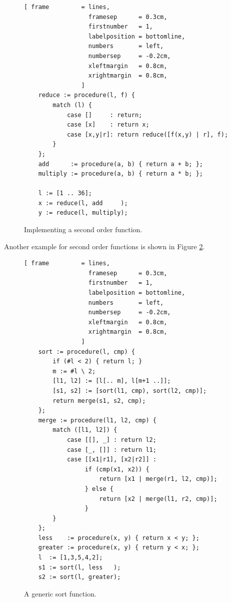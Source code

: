 \documentclass[11pt]{report}
\begin{document}
\begin{figure}[!ht]
\centering
\begin{Verbatim}[ frame         = lines, 
                  framesep      = 0.3cm, 
                  firstnumber   = 1,
                  labelposition = bottomline,
                  numbers       = left,
                  numbersep     = -0.2cm,
                  xleftmargin   = 0.8cm,
                  xrightmargin  = 0.8cm,
                ]
    reduce := procedure(l, f) {
        match (l) {
            case []     : return;
            case [x]    : return x;
            case [x,y|r]: return reduce([f(x,y) | r], f);
        }    
    };
    add      := procedure(a, b) { return a + b; };
    multiply := procedure(a, b) { return a * b; };
    
    l := [1 .. 36];
    x := reduce(l, add     );
    y := reduce(l, multiply);
\end{Verbatim}
\vspace*{-0.3cm}
\caption{Implementing a second order function.}
\label{fig:reduce.stlx}
\end{figure}

Another example for second order functions is shown in Figure \ref{fig:merge-sort.stlx}.

\begin{figure}[!ht]
\centering
\begin{Verbatim}[ frame         = lines, 
                  framesep      = 0.3cm, 
                  firstnumber   = 1,
                  labelposition = bottomline,
                  numbers       = left,
                  numbersep     = -0.2cm,
                  xleftmargin   = 0.8cm,
                  xrightmargin  = 0.8cm,
                ]
    sort := procedure(l, cmp) {
        if (#l < 2) { return l; }
        m := #l \ 2;
        [l1, l2] := [l[.. m], l[m+1 ..]];
        [s1, s2] := [sort(l1, cmp), sort(l2, cmp)];
        return merge(s1, s2, cmp);
    };
    merge := procedure(l1, l2, cmp) {
        match ([l1, l2]) {
            case [[], _] : return l2;
            case [_, []] : return l1;
            case [[x1|r1], [x2|r2]] : 
                 if (cmp(x1, x2)) {
                     return [x1 | merge(r1, l2, cmp)];
                 } else {
                     return [x2 | merge(l1, r2, cmp)];
                 }
        }
    };
    less    := procedure(x, y) { return x < y; };
    greater := procedure(x, y) { return y < x; };
    l  := [1,3,5,4,2];    
    s1 := sort(l, less   );
    s2 := sort(l, greater);
\end{Verbatim}
\vspace*{-0.3cm}
\caption{A generic sort function.}
\label{fig:merge-sort.stlx}
\end{figure}
\end{document}
